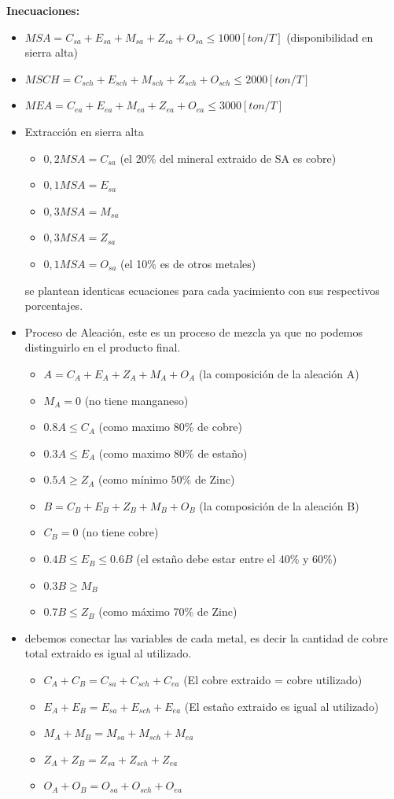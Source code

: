 \documentclass[12pt]{book}
\begin{document}
\textbf{Inecuaciones: }

\begin{itemize}
\item $ MSA = C_{sa} + E_{sa} + M_{sa} + Z_{sa} + O_{sa} \leq 1000 [ton/T]$ (disponibilidad en sierra alta)
\item $ MSCH = C_{sch} + E_{sch} + M_{sch} + Z_{sch} + O_{sch} \leq 2000 [ton/T]$
\item $ MEA = C_{ea} + E_{ea} + M_{ea} + Z_{ea} + O_{ea} \leq 3000 [ton/T]$
\item Extracción en sierra alta
	\begin{itemize}
	\item $ 0,2 MSA = C_{sa}$ (el 20\% del mineral extraido de SA es cobre)
	\item $ 0,1 MSA = E_{sa}$
	\item $ 0,3 MSA = M_{sa}$	
	\item $ 0,3 MSA = Z_{sa}$	
	\item $ 0,1 MSA = O_{sa}$ (el 10\% es de otros metales)	
	\end{itemize}
	se plantean identicas ecuaciones para cada yacimiento con sus respectivos porcentajes.
\item Proceso de Aleación, este es un proceso de mezcla ya que no podemos distinguirlo en el producto final.
	\begin{itemize}
	\item $ A = C_A + E_A + Z_A + M_A + O_A$ (la composición de la aleación A)
	\item $ M_A = 0 $ (no tiene manganeso)
	\item $ 0.8 A \leq C_A  $ (como maximo 80\% de cobre)
	\item $ 0.3 A \leq E_A $ (como maximo 80\% de estaño)
	\item $ 0.5 A \geq Z_A$ (como mínimo 50\% de Zinc)
	
	\item $ B = C_B + E_B + Z_B + M_B + O_B$ (la composición de la aleación B)
	\item $ C_B = 0 $ (no tiene cobre)
	\item $ 0.4 B \leq E_B  \leq 0.6 B$ (el estaño debe estar entre el 40\% y 60\%)
	\item $ 0.3 B \geq M_B $
	\item $ 0.7 B \leq Z_B$ (como máximo 70\% de Zinc)
		
	\end{itemize}
\item debemos conectar las variables de cada metal, es decir la cantidad de cobre total extraido es igual al utilizado.
	\begin{itemize}
	\item $C_A + C_B = C_{sa}+ C_{sch}+C_{ea}$ (El cobre extraido = cobre utilizado)
	\item $E_A + E_B = E_{sa}+ E_{sch}+E_{ea}$ (El estaño extraido es igual al utilizado)
	\item $M_A + M_B = M_{sa}+ M_{sch}+M_{ea}$	
	\item $Z_A + Z_B = Z_{sa}+ Z_{sch}+Z_{ea}$
	\item $O_A + O_B = O_{sa}+ O_{sch}+O_{ea}$ 
	\end{itemize}		
\end{itemize}
\end{document}
